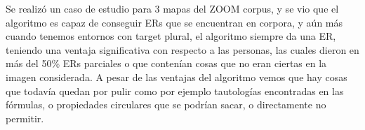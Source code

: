 Se realiz\'o un caso de estudio para 3 mapas del ZOOM corpus, y se vio que el algoritmo es capaz de conseguir ERs que se encuentran en corpora, y a\'un m\'as cuando tenemos entornos con target plural, el algoritmo siempre da una ER, teniendo una ventaja significativa con respecto a las personas, las cuales dieron en m\'as del 50\% ERs parciales o que conten\'ian cosas que no eran ciertas en la imagen considerada. A pesar de las ventajas del algoritmo vemos que hay cosas que todav\'ia quedan por pulir como por ejemplo tautolog\'ias encontradas en las f\'ormulas, o propiedades circulares que se podr\'ian sacar, o directamente no permitir.

 

